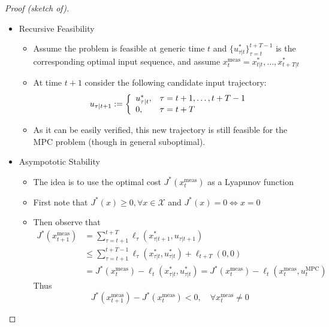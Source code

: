 \documentclass[openany]{book}
\theoremstyle{definition}
\theoremstyle{remark}
\begin{document}
\begin{proof}[Proof (sketch of)]
    \begin{itemize}
        \item Recursive Feasibility
            \begin{itemize}
                \item Assume the problem is feasible at generic time $t$ and $\{u^*_{\tau|t}\}^{t+T-1}_{\tau=t}$ is the corresponding optimal input sequence, and assume $x_t^{\text{meas}}=x^*_{t|t},\dots,x^*_{t+T|t}$
                \item At time $t+1$ consider the following candidate input trajectory: 
                    \[
                        u_{\tau|t+1}:=\left\{\begin{array}{l l}
                                u_{\tau|t}^*, & \tau = t+1,\dots,t+T-1\\
                                0, & \tau = t+T
                        \end{array} \right.
                    \]
                \item As it can be easily verified, this new trajectory is still feasible for the MPC problem (though in general suboptimal).
            \end{itemize}
        \item Asympototic Stability 
            \begin{itemize}
                \item The idea is to use the optimal cost $J^*(x_t^{\text{meas}})$ as a Lyapunov function 
                \item First note that $J^*(x)\geq 0, \forall x\in\mathcal{X}$ and $J^*(x)=0 \iff x=0$
                    \item Then observe that 
                        \begin{align*}
                            J^*(x_{t+1}^{\text{meas}}) & =\displaystyle\sum_{\tau=t+1}^{t+T}\ell_{\tau}(x_{\tau|t+1}^*,u_{\tau|t+1})\\
                                                       &\leq \displaystyle\sum_{\tau=t+1}^{t+T-1}\ell_{\tau}(x_{\tau|t}^*,u_{\tau|t}^*)+\ell_{t+T}(0,0)\\
                                                       & =J^*(x_t^{\text{meas}})-\ell_t(x_{\tau|t}^*,u^*_{\tau|t})=J^*(x_t^{\text{meas}})-\ell_t(x_t^{\text{meas}},u_t^{\text{MPC}})
                        \end{align*}
                        Thus
                        \[
                            J^*(x_{t+1}^{\text{meas}})-J^*(x_t^{\text{meas}})<0, \quad \forall x_t^{\text{meas}}\neq 0
                        \]
            \end{itemize}
    \end{itemize}
\end{proof}
\end{document}

